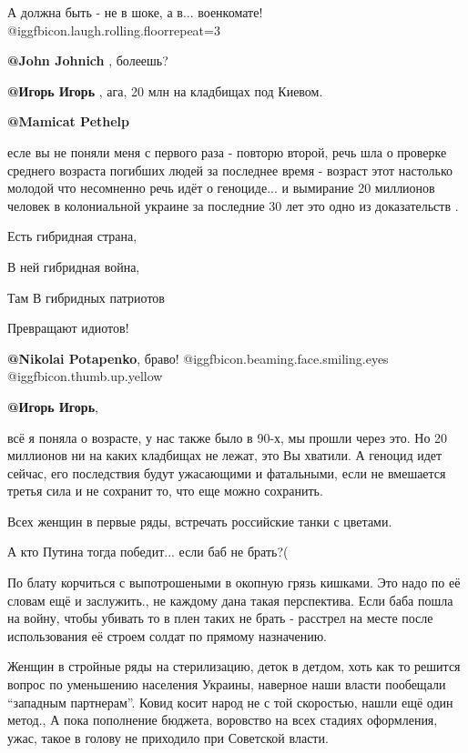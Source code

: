 \begin{itemize}
А должна быть - не в шоке, а в... военкомате! @igg{fbicon.laugh.rolling.floor}{repeat=3} 

\textbf{@John Johnich}  , болеешь?

\textbf{@Игорь Игорь}  , ага, 20 млн на кладбищах под Киевом.

\textbf{@Mamicat Pethelp}  

есле вы не поняли меня с первого раза - повторю второй, речь шла о проверке
среднего возраста погибших людей за последнее время - возраст этот настолько
молодой что несомненно речь идёт о геноциде...  и вымирание 20 миллионов
человек в колониальной украине за последние 30 лет это одно из доказательств . 


Есть гибридная страна, 

В ней гибридная война, 

Там В гибридных патриотов

Превращают идиотов!

\textbf{@Nikolai Potapenko}, браво!  @igg{fbicon.beaming.face.smiling.eyes}  @igg{fbicon.thumb.up.yellow} 

\textbf{@Игорь Игорь}, 

всё я поняла о возрасте, у нас также было в 90-х, мы прошли через это. Но 20
миллионов ни на каких кладбищах не лежат, это Вы хватили. А геноцид идет
сейчас, его последствия будут ужасающими и фатальными, если не вмешается
третья сила и не сохранит то, что еще можно сохранить.

Всех женщин  в первые ряды, встречать российские танки с цветами.

А кто Путина тогда победит... если баб не брать?( 


По блату корчиться с выпотрошеными в окопную грязь кишками. Это надо по её
словам ещё и заслужить., не каждому дана такая перспектива. Если баба пошла на
войну, чтобы убивать то в плен таких не брать - расстрел на месте после
использования её строем солдат по прямому назначению.


Женщин в стройные ряды на стерилизацию, деток в детдом, хоть как то решится
вопрос по уменьшению населения Украины, наверное наши власти пообещали
\enquote{западным партнерам}. Ковид косит народ не с той скоростью, нашли ещё один
метод., А пока пополнение бюджета, воровство на всех стадиях оформления, ужас,
такое в голову не приходило при Советской власти.


\end{itemize}
